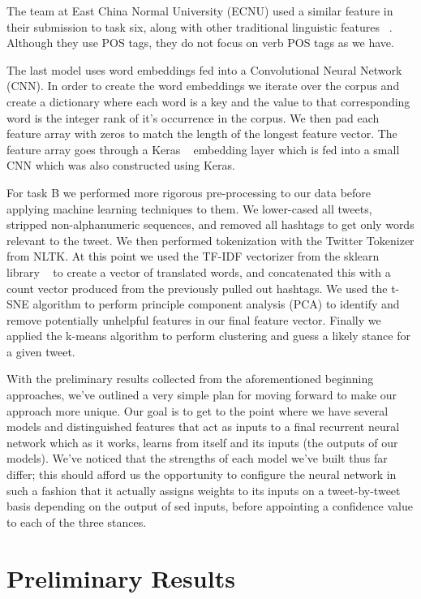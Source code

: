 \documentclass[11pt,letterpaper]{article}
\begin{document}
The team at East China Normal University (ECNU) used a similar feature in their submission to task six, along with other traditional linguistic features ~\cite{Zhang}. Although they use POS tags, they do not focus on verb POS tags as we have.

The last model uses word embeddings fed into a Convolutional Neural Network (CNN). In order to create the word embeddings we iterate over the corpus and create a dictionary where each word is a key and the value to that corresponding word is the integer rank of it's occurrence in the corpus. We then pad each feature array with zeros to match the length of the longest feature vector. The feature array goes through a Keras ~\cite{chollet2015keras} embedding layer which is fed into a small CNN which was also constructed using Keras.

For task B we performed more rigorous pre-processing to our data before applying machine learning techniques to them. We lower-cased all tweets, stripped non-alphanumeric sequences, and removed all hashtags to get only words relevant to the tweet. We then performed tokenization with the Twitter Tokenizer from NLTK. At this point we used the TF-IDF vectorizer from the sklearn library ~\cite{sklearn} to create a vector of translated words, and concatenated this with a count vector produced from the previously pulled out hashtags. We used the t-SNE algorithm to perform principle component analysis (PCA) to identify and remove potentially unhelpful features in our final feature vector. Finally we applied the k-means algorithm to perform clustering and guess a likely stance for a given tweet.

With the preliminary results collected from the aforementioned beginning approaches, we’ve outlined a very simple plan for moving forward to make our approach more unique. Our goal is to get to the point where we have several models and distinguished features that act as inputs to a final recurrent neural network which as it works, learns from itself and its inputs (the outputs of our models). We’ve noticed that the strengths of each model we’ve built thus far differ; this should afford us the opportunity to configure the neural network in such a fashion that it actually assigns weights to its inputs on a tweet-by-tweet basis depending on the output of sed inputs, before appointing a confidence value to each of the three stances.

\section{Preliminary Results}
\end{document}

